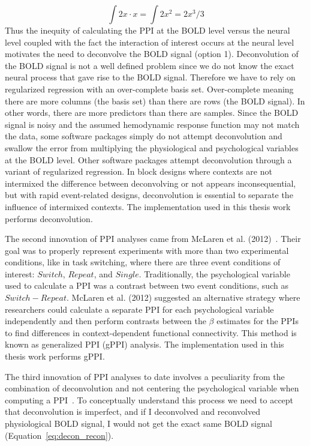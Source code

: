 \documentclass[phd,figures,tables,ackpage,abstractpage,publicabstractpage]{uithesis}
\begin{document}
\begin{equation}
   \int 2x \cdot x = \int 2x^2 = 2x^3 / 3
  \label{eq:familiar_int2}
\end{equation}
Thus the inequity of calculating the PPI at the BOLD level versus
the neural level coupled with the fact the interaction of interest
occurs at the neural level motivates the
need to deconvolve the BOLD signal (option 1).
Deconvolution of the BOLD signal is not a well defined problem since
we do not know the exact neural process that gave rise to the BOLD signal.
Therefore we have to rely on regularized regression with an over-complete
basis set.
Over-complete meaning there are more columns (the basis set) than there
are rows (the BOLD signal).
In other words, there are more predictors than there are samples.
Since the BOLD signal is noisy and the assumed hemodynamic response function
may not match the data, some software packages simply do not attempt
deconvolution and swallow the error from multiplying the physiological and psychological
variables at the BOLD level.
Other software packages attempt deconvolution through a variant of
regularized regression.
In block designs where contexts are not intermixed the difference between
deconvolving or not appears inconsequential, but with rapid event-related designs,
deconvolution is essential to separate the influence of intermixed contexts.
The implementation used in this thesis work performs deconvolution.

The second innovation of PPI analyses came from McLaren et al. (2012)~\cite{McLaren2012}.
Their goal was to properly represent experiments with more than two experimental conditions, like
in task switching, where there are three event conditions of interest:
$Switch$, $Repeat$, and $Single$.
Traditionally, the psychological variable used to calculate a PPI
was a contrast between two event conditions, such as
$Switch - Repeat$.
McLaren et al. (2012) suggested an alternative strategy where researchers could
calculate a separate PPI for each psychological variable independently and then
perform contrasts between the $\beta$ estimates for the PPIs
to find differences in context-dependent functional connectivity.
This method is known as generalized PPI (gPPI) analysis.
The implementation used in this thesis work performs gPPI.

The third innovation of PPI analyses to date involves a peculiarity from the combination of
deconvolution and not centering the psychological variable when computing a PPI~\cite{Di2017}.
To conceptually understand this process we need to accept that deconvolution is imperfect, and if I
deconvolved and reconvolved physiological BOLD signal,
I would not get the exact same BOLD signal (Equation~\ref{eq:decon_recon}).
\end{document}
